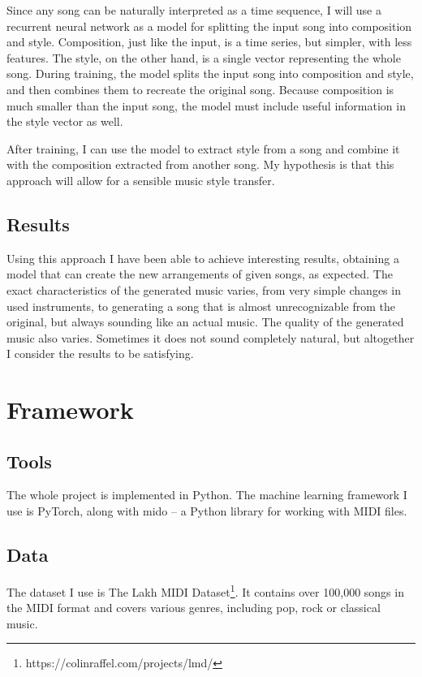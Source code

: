 \documentclass[en]{pracamgr}
\begin{document}
Since any song can be naturally interpreted as a time sequence, I will use a recurrent neural network as a model for splitting the input song into composition and style.
Composition, just like the input, is a time series, but simpler, with less features.
The style, on the other hand, is a single vector representing the whole song.
During training, the model splits the input song into composition and style, and then combines them to recreate the original song.
Because composition is much smaller than the input song, the model must include useful information in the style vector as well.

After training, I can use the model to extract style from a song and combine it with the composition extracted from another song.
My hypothesis is that this approach will allow for a sensible music style transfer.

\section{Results}

Using this approach I have been able to achieve interesting results, obtaining a model that can create the new arrangements of given songs, as expected.
The exact characteristics of the generated music varies, from very simple changes in used instruments, to generating a song that is almost unrecognizable from the original, but always sounding like an actual music.
The quality of the generated music also varies. Sometimes it does not sound completely natural, but altogether I consider the results to be satisfying.

\chapter{Framework}

\section{Tools}

The whole project is implemented in Python.
The machine learning framework I use is PyTorch, along with mido -- a Python library for working with MIDI files.

\section{Data}

The dataset I use is The Lakh MIDI Dataset\footnote{https://colinraffel.com/projects/lmd/}.
It contains over 100,000 songs in the MIDI format and covers various genres, including pop, rock or classical music.
\end{document}
